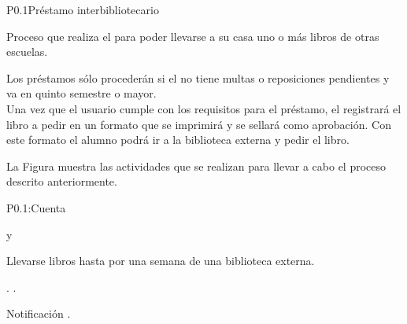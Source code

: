 
\begin{Proceso}{P0.1}{Préstamo interbibliotecario} {
  

  Proceso que realiza el  para poder llevarse a su casa uno o más libros de otras escuelas.
  
Los préstamos sólo procederán si el  no tiene multas o reposiciones pendientes y va en quinto semestre o mayor.\\
  Una vez que el usuario cumple con los requisitos para el préstamo, el  registrará el libro a pedir en un formato que se imprimirá y se sellará como aprobación. Con este formato el alumno podrá ir a la biblioteca externa y pedir el libro. 
  

  \noindent La Figura  muestra las actividades que se realizan para llevar a cabo el proceso descrito anteriormente.


} {P0.1:Cuenta}


   { %
       y  
  }

   { %
    Llevarse libros hasta por una semana de una biblioteca externa. 
  }

   { %
  	\begin{UClist}
     	\UCli  {}.
     	\UCli  {}.
    \end {UClist}
  }
  
   { %
  }

   { %
    \begin{UClist}
      \UCli Notificación .
    \end{UClist}
  }


\end{Proceso}

